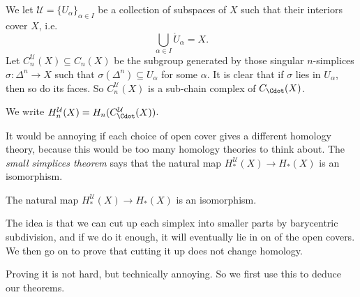 \documentclass[a4paper]{article}
\theoremstyle{definition}
\begin{document}
\begin{defi}
  We let $\mathcal{U} = \{U_\alpha\}_{\alpha \in I}$ be a collection of subspaces of $X$ such that their interiors cover $X$, i.e.
  \[
    \bigcup_{\alpha \in I} \mathring{U}_\alpha = X.
  \]
  Let $C_n^\mathcal{U}(X) \subseteq C_n(X)$ be the subgroup generated by those singular $n$-simplices $\sigma: \Delta^n \to X$ such that $\sigma(\Delta^n) \subseteq U_\alpha$ for some $\alpha$. It is clear that if $\sigma$ lies in $U_\alpha$, then so do its faces. So $C_n^{\mathcal{U}}(X)$ is a sub-chain complex of $C_\Cdot(X)$.

  We write $H_n^\mathcal{U}(X) = H_n(C_\Cdot^\mathcal{U}(X))$.
\end{defi}
It would be annoying if each choice of open cover gives a different homology theory, because this would be too many homology theories to think about. The \emph{small simplices theorem} says that the natural map $H_*^\mathcal{U}(X) \to H_*(X)$ is an isomorphism.

\begin{thm}
  The natural map $H_*^\mathcal{U}(X) \to H_*(X)$ is an isomorphism.
\end{thm}

The idea is that we can cut up each simplex into smaller parts by barycentric subdivision, and if we do it enough, it will eventually lie in on of the open covers. We then go on to prove that cutting it up does not change homology.

Proving it is not hard, but technically annoying. So we first use this to deduce our theorems.
\end{document}

